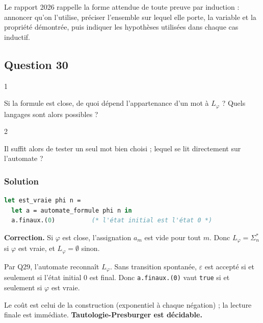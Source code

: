\documentclass[11pt,a4paper]{article}
\begin{document}
\begin{jury}

Le rapport 2026 rappelle la forme attendue de toute preuve par induction : annoncer qu'on l'utilise, préciser l'ensemble sur lequel elle porte, la variable et la propriété démontrée, puis indiquer les hypothèses utilisées dans chaque cas inductif.

\end{jury}

\hypertarget{question-30}{%
\subsection{Question 30}\label{question-30}}

\begin{indication}{1}

Si la formule est close, de quoi dépend l'appartenance d'un mot à \(L_\varphi\) ? Quels langages sont alors possibles ?

\end{indication}

\begin{indication}{2}

Il suffit alors de tester un seul mot bien choisi ; lequel se lit directement sur l'automate ?

\end{indication}

\hypertarget{solution-29}{%
\subsubsection{Solution}\label{solution-29}}

\begin{lstlisting}[language=Caml]
let est_vraie phi n =
  let a = automate_formule phi n in
  a.finaux.(0)          (* l'état initial est l'état 0 *)
\end{lstlisting}

\textbf{Correction.} Si \(\varphi\) est close, l'assignation \(a_m\) est vide pour tout \(m\). Donc \(L_\varphi=\Sigma_n^*\) si \(\varphi\) est vraie, et \(L_\varphi=\emptyset\) sinon.

Par Q29, l'automate reconnaît \(L_\varphi\). Sans transition spontanée, \(\varepsilon\) est accepté si et seulement si l'état initial \(0\) est final. Donc \texttt{a.finaux.(0)} vaut \texttt{true} si et seulement si \(\varphi\) est vraie.

Le coût est celui de la construction (exponentiel à chaque négation) ; la lecture finale est immédiate. \textbf{Tautologie-Presburger est décidable.}
\end{document}
